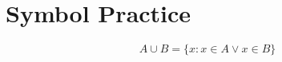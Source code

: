 \documentclass[11pt]{article}
\begin{document}
\hspace{10 cm}

\section*{Symbol Practice}
\[A \cup B = \{x : x \in A \lor x \in B\}\]
\hspace{10 cm}
\end{document}
